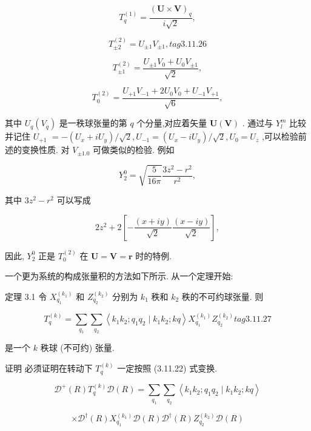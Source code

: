 $$
{T}_{q}^{\left( 1\right) } = \frac{{\left( \mathbf{U} \times \mathbf{V}\right) }_{q}}{i\sqrt{2}},
$$

$$
{T}_{\pm 2}^{\left( 2\right) } = {U}_{\pm 1}{V}_{\pm 1}, tag{3.11.26}
$$

$$
{T}_{\pm 1}^{\left( 2\right) } = \frac{{U}_{\pm 1}{V}_{0} + {U}_{0}{V}_{\pm 1}}{\sqrt{2}},
$$

$$
{T}_{0}^{\left( 2\right) } = \frac{{U}_{+1}{V}_{-1} + 2{U}_{0}{V}_{0} + {U}_{-1}{V}_{+1}}{\sqrt{6}},
$$

其中 ${U}_{q}\left( {V}_{q}\right)$ 是一秩球张量的第 $q$ 个分量,对应着矢量 $\mathbf{U}\left( \mathbf{V}\right)$ . 通过与 ${Y}_{l}^{m}$ 比较并记住 ${U}_{+1}$ $= - \left( {{U}_{x} + i{U}_{y}}\right) /\sqrt{2},{U}_{-1} = \left( {{U}_{x} - i{U}_{y}}\right) /\sqrt{2},{U}_{0} = {U}_{z}$ ,可以检验前述的变换性质. 对 ${V}_{\pm {1.0}}$ 可做类似的检验. 例如

$$
{Y}_{2}^{0} = \sqrt{\frac{5}{16\pi }}\frac{3{z}^{2} - {r}^{2}}{{r}^{2}},
$$

其中 $3{z}^{2} - {r}^{2}$ 可以写成

$$
2{z}^{2} + 2\left\lbrack {-\frac{\left( x + iy\right) }{\sqrt{2}}\frac{\left( x - iy\right) }{\sqrt{2}}}\right\rbrack ,
$$

因此, ${Y}_{2}^{0}$ 正是 ${T}_{0}^{\left( 2\right) }$ 在 $\mathbf{U} = \mathbf{V} = \mathbf{r}$ 时的特例.

一个更为系统的构成张量积的方法如下所示. 从一个定理开始:

定理 3.1 令 ${X}_{{q}_{1}}^{\left( {k}_{1}\right) }$ 和 ${Z}_{{q}_{2}}^{\left( {k}_{2}\right) }$ 分别为 ${k}_{1}$ 秩和 ${k}_{2}$ 秩的不可约球张量. 则

$$
{T}_{q}^{\left( k\right) } = \mathop{\sum }\limits_{{q}_{1}}\mathop{\sum }\limits_{{q}_{2}}\left\langle {{k}_{1}{k}_{2};{q}_{1}{q}_{2} \mid {k}_{1}{k}_{2};{kq}}\right\rangle {X}_{{q}_{1}}^{\left( {k}_{1}\right) }{Z}_{{q}_{2}}^{\left( {k}_{2}\right) } tag{3.11.27}
$$

是一个 $k$ 秩球 (不可约) 张量.

证明 必须证明在转动下 ${T}_{q}^{\left( k\right) }$ 一定按照 (3.11.22) 式变换.

$$
{\mathcal{D}}^{ + }\left( R\right) {T}_{q}^{\left( k\right) }\mathcal{D}\left( R\right) = \mathop{\sum }\limits_{{q}_{1}}\mathop{\sum }\limits_{{q}_{2}}\left\langle {{k}_{1}{k}_{2};{q}_{1}{q}_{2} \mid {k}_{1}{k}_{2};{kq}}\right\rangle
$$

$$
\times {\mathcal{D}}^{ \dagger }\left( R\right) {X}_{{q}_{1}}^{\left( {k}_{1}\right) }\mathcal{D}\left( R\right) {\mathcal{D}}^{ \dagger }\left( R\right) {Z}_{{q}_{2}}^{\left( {k}_{2}\right) }\mathcal{D}\left( R\right)
$$

